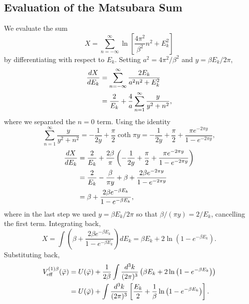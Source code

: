 \subsection*{Evaluation of the Matsubara Sum}

We evaluate the sum
\begin{equation}
	X = \sum_{n=-\infty}^{\infty}
	\ln\left[\frac{4\pi^2}{\beta^2}n^2+E_k^2\right]
\end{equation}
by differentiating with respect to $E_k$. Setting $a^2 = 4\pi^2/\beta^2$
and $y = \beta E_k/2\pi$,
\begin{align}
	\frac{dX}{dE_k}
	 & = \sum_{n=-\infty}^{\infty}\frac{2E_k}{a^2n^2+E_k^2} \notag        \\
	 & = \frac{2}{E_k} + \frac{4}{a}\sum_{n=1}^{\infty}\frac{y}{y^2+n^2},
\end{align}
where we separated the $n=0$ term. Using the identity
\begin{equation}
	\sum_{n=1}^{\infty}\frac{y}{y^2+n^2}
	= -\frac{1}{2y} + \frac{\pi}{2}\coth\pi y
	= -\frac{1}{2y} + \frac{\pi}{2}
	+ \frac{\pi e^{-2\pi y}}{1-e^{-2\pi y}},
\end{equation}
\begin{align}
	\frac{dX}{dE_k}
	 & = \frac{2}{E_k} + \frac{2\beta}{\pi}
	\left(-\frac{1}{2y}+\frac{\pi}{2}
	+\frac{\pi e^{-2\pi y}}{1-e^{-2\pi y}}\right)
	\notag                                                       \\
	 & = \frac{2}{E_k} - \frac{\beta}{\pi y}
	+ \beta + \frac{2\beta e^{-2\pi y}}{1-e^{-2\pi y}}
	\notag                                                       \\
	 & = \beta + \frac{2\beta e^{-\beta E_k}}{1-e^{-\beta E_k}},
\end{align}
where in the last step we used $y = \beta E_k/2\pi$ so that
$\beta/(\pi y) = 2/E_k$, cancelling the first term. Integrating back,
\begin{equation}
	X = \int\left(\beta + \frac{2\beta e^{-\beta E_k}}
	{1-e^{-\beta E_k}}\right)dE_k
	= \beta E_k + 2\ln\left(1-e^{-\beta E_k}\right).
\end{equation}
Substituting back,
\begin{align}
	V_{\text{eff}}^{(1)\beta}(\bar\varphi)
	 & = U(\bar\varphi) + \frac{1}{2\beta}
	\int\frac{d^3k}{(2\pi)^3}
	\left(\beta E_k + 2\ln\left(1-e^{-\beta E_k}\right)\right)
	\notag                                          \\
	 & = U(\bar\varphi) + \int\frac{d^3k}{(2\pi)^3}
	\left[\frac{E_k}{2}
		+ \frac{1}{\beta}\ln\left(1-e^{-\beta E_k}\right)\right].
\end{align}
